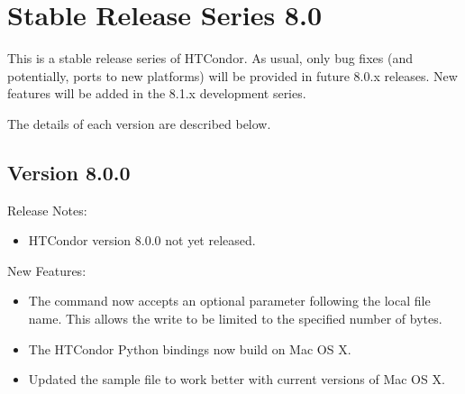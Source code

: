 
\section{\label{sec:History-8-0}Stable Release Series 8.0}

This is a stable release series of HTCondor.
As usual, only bug fixes (and potentially, ports to new platforms)
will be provided in future 8.0.x releases.
New features will be added in the 8.1.x development series.

The details of each version are described below.

\subsection*{\label{sec:New-8-0-0}Version 8.0.0}

\noindent Release Notes:

\begin{itemize}

\item HTCondor version 8.0.0 not yet released.

\end{itemize}


\noindent New Features:

\begin{itemize}

\item The   command now accepts an 
optional  parameter following the local file name.
This allows the write to be limited to the specified number of bytes.

\item The HTCondor Python bindings now build on Mac OS X.

\item Updated the sample  file to work better with
current versions of Mac OS X.

\end{itemize}

